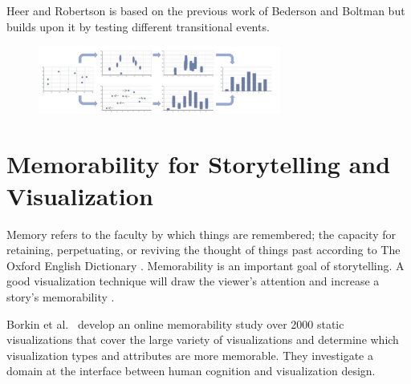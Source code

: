 \documentclass{egpubl}
\begin{document}
Heer and Robertson is based on the previous work of Bederson and Boltman \cite{bedrson} but builds upon it by testing different transitional events.

\begin{figure}
\begingroup
\centering
\includegraphics[width=8cm]{./images/AnimatedTransitions}
\label{fig:Heer2007}
\endgroup
\end{figure}


\section{Memorability for Storytelling and Visualization}
Memory refers to the faculty by which things are remembered; the capacity for retaining, perpetuating, or reviving the thought of things past according to The Oxford English Dictionary \cite{memory}. Memorability is an important goal of storytelling. A good visualization technique will draw the viewer's attention and increase a story's memorability \cite{bateman}.

 Borkin et al.\ \cite{borkin2013makes} develop an online memorability study over 2000 static visualizations that cover the large variety of visualizations and determine which visualization types and attributes are more memorable. They investigate a domain at the interface between human cognition and visualization design.
\end{document}
